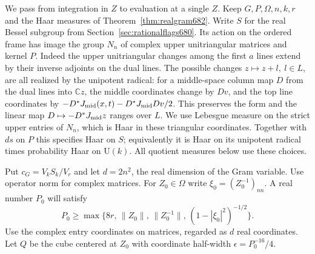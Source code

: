 \documentclass[a4paper,11pt]{article}
\theoremstyle{definition}
\theoremstyle{remark}
\numberwithin{equation}{section}
\begin{document}
We pass from integration in \(Z\) to evaluation at a single \(Z\).
Keep \(G,P,\Omega,n,k,r\) and the Haar measures of
Theorem~\ref{thm:realgram682}. Write \(S\) for the real Bessel
subgroup from Section~\ref{sec:rationalflags680}. Its action
on the ordered frame has image the group \(N_n\) of complex
upper unitriangular matrices and kernel \(P\). Indeed the
upper unitriangular changes among the first \(a\) lines extend
by their inverse adjoints on the dual lines. The possible
changes \(z\mapsto z+l,\ l\in L\), are all realized by the
unipotent radical: for a middle-space column map \(D\) from
the dual lines into \(\mathbb Cz\), the middle coordinates
change by \(Dv\), and the top line coordinates by
\(-D^*J_{\rm mid}(x,t)-D^*J_{\rm mid}Dv/2\). This preserves the
form and the linear map \(D\mapsto-D^*J_{\rm mid}z\) ranges
over \(L\). We use Lebesgue measure on the strict upper entries
of \(N_n\), which is Haar in these triangular coordinates.
Together with \(ds\) on \(P\) this specifies Haar on \(S\);
equivalently it is Haar on its unipotent radical times
probability Haar on \(\mathrm U(k)\). All quotient measures
below use these choices.

Put \(c_G=V_k S_k/V_r\) and let \(d=2n^2\), the real dimension of
the Gram variable. Use operator norm for complex matrices. For
\(Z_0\in\Omega\) write \(\xi_0=(Z_0^{-1})_{nn}\). A real number
\(P_0\) will satisfy
\[
 P_0\ge\max\{8r,\,\|Z_0\|,\,\|Z_0^{-1}\|,
                   \,(1-|\xi_0|^2)^{-1/2}\}.
\]
Use the complex entry coordinates on matrices, regarded as
\(d\) real coordinates. Let \(Q\) be the cube centered at \(Z_0\)
with coordinate half-width \(\epsilon=P_0^{-16}/4\).
\end{document}
